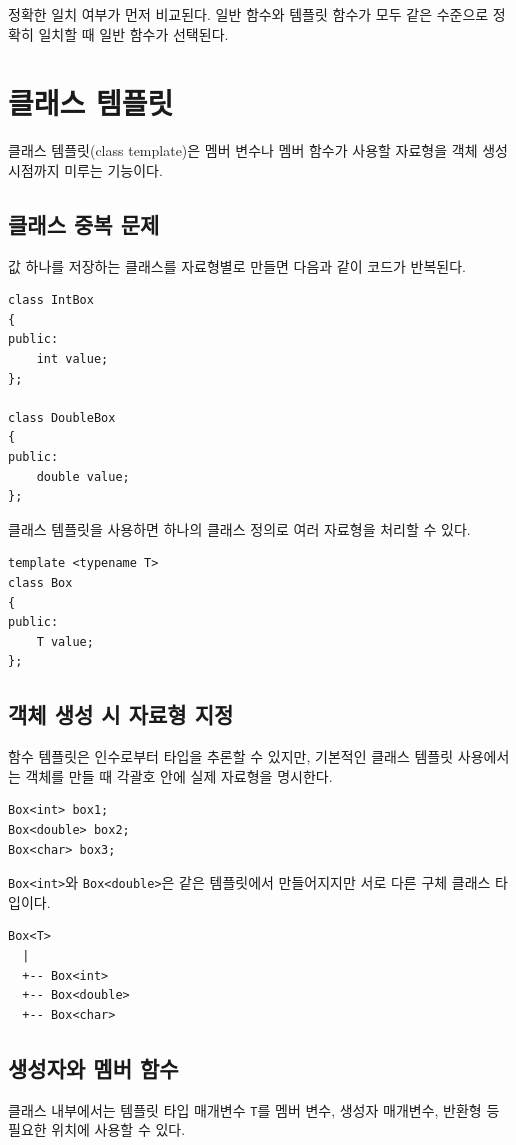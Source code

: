 \documentclass[11pt,a4paper]{article}
\begin{document}
\begin{importantbox}
정확한 일치 여부가 먼저 비교된다. 일반 함수와 템플릿 함수가 모두 같은 수준으로 정확히 일치할 때 일반 함수가 선택된다.
\end{importantbox}

\section{클래스 템플릿}
클래스 템플릿(class template)은 멤버 변수나 멤버 함수가 사용할 자료형을 객체 생성 시점까지 미루는 기능이다.

\subsection{클래스 중복 문제}
값 하나를 저장하는 클래스를 자료형별로 만들면 다음과 같이 코드가 반복된다.

\begin{lstlisting}
class IntBox
{
public:
    int value;
};

class DoubleBox
{
public:
    double value;
};
\end{lstlisting}

클래스 템플릿을 사용하면 하나의 클래스 정의로 여러 자료형을 처리할 수 있다.

\begin{lstlisting}
template <typename T>
class Box
{
public:
    T value;
};
\end{lstlisting}

\subsection{객체 생성 시 자료형 지정}
함수 템플릿은 인수로부터 타입을 추론할 수 있지만, 기본적인 클래스 템플릿 사용에서는 객체를 만들 때 각괄호 안에 실제 자료형을 명시한다.

\begin{lstlisting}
Box<int> box1;
Box<double> box2;
Box<char> box3;
\end{lstlisting}

\texttt{Box<int>}와 \texttt{Box<double>}은 같은 템플릿에서 만들어지지만 서로 다른 구체 클래스 타입이다.

\begin{verbatim}
Box<T>
  |
  +-- Box<int>
  +-- Box<double>
  +-- Box<char>
\end{verbatim}

\subsection{생성자와 멤버 함수}
클래스 내부에서는 템플릿 타입 매개변수 \texttt{T}를 멤버 변수, 생성자 매개변수, 반환형 등 필요한 위치에 사용할 수 있다.
\end{document}
